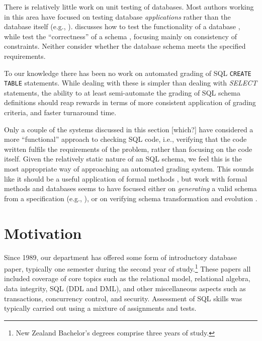 \documentclass[sigconf, authordraft, capitalise]{acmart}
\begin{document}
There is relatively little work on unit testing of databases. Most authors working in this area have focused on testing database \emph{applications} rather than the database itself (e.g., \cite{Binnig.C-2008a-Multi-RQP,Chays.D-2008a-Query-based,Marcozzi.M-2012a-Test,Haller.K-2010a-Test}). \citeauthor{Ambler.S-2006a-Database} discusses how to test the functionality of a database \cite{Ambler.S-2006a-Database}, while \citeauthor{Farre.C-2008a-SVTe} test the ``correctness'' of a schema \cite{Farre.C-2008a-SVTe}, focusing mainly on consistency of constraints. Neither consider whether the database schema meets the specified requirements.

To our knowledge there has been no work on automated grading of SQL \texttt{CREATE TABLE} statements. While dealing with these is simpler than dealing with \emph{SELECT} statements, the ability to at least semi-automate the grading of SQL schema definitions should reap rewards in terms of more consistent application of grading criteria, and faster turnaround time.

Only a couple of the systems discussed in this section [which?] have considered a more ``functional'' approach to checking SQL code, i.e., verifying that the code written fulfils the requirements of the problem, rather than focusing on the code itself. Given the relatively static nature of an SQL schema, we feel this is the most appropriate way of approaching an automated grading system. This sounds like it should be a useful application of formal methods \cite{Spivey.J-1989a-An-introduction}, but work with formal methods and databases seems to have focused either on \emph{generating} a valid schema from a specification (e.g., \cite{Vatanawood.W-2004a-Formal,Lukovic.I-2003a-Proceedings,Choppella.V-2006a-Constructing}), or on verifying schema transformation and evolution \cite{Bench-Capon.T-1998a-Report}.


\section{Motivation}
\label{sec-motivation}

Since 1989, our department has offered some form of introductory database paper, typically one semester during the second year of study.\footnote{New Zealand Bachelor's degrees comprise three years of study.} These papers all included coverage of core topics such as the relational model, relational algebra, data integrity, SQL (DDL and DML), and other miscellaneous aspects such as transactions, concurrency control, and security. Assessment of SQL skills was typically carried out using a mixture of assignments and tests.
\end{document}
